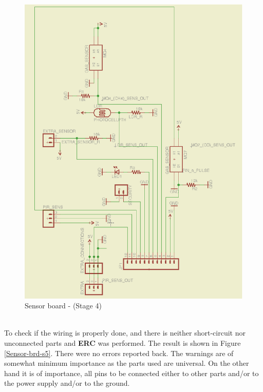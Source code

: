 \documentclass[12pt,a4paper,draft]{report}
\begin{document}
\begin{figure}[H]
\centering
\includegraphics*[scale=0.25]{sens_brd_s4}
\caption{Sensor board -  (Stage 4)}
\label{Sensor-brd-s4} 
\end{figure}
\ \\
To check if the wiring is properly done, and there is neither short-circuit nor unconnected parts and \textbf{ERC} was performed. The result is shown in Figure \ref{Sensor-brd-s5}. There were no errors reported back. The warnings are of somewhat minimum importance as the parts used are universal. On the other hand it is of importance, all pins to be connected either to other parts and/or to the power supply and/or to the ground.
\ \\
\end{document}
